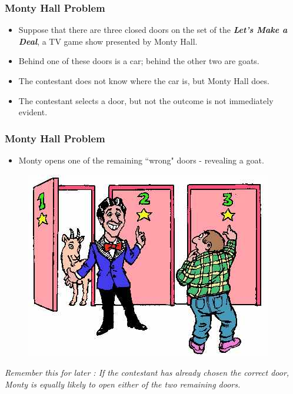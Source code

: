 \documentclass{beamer}
\begin{document}
\begin{frame}
	
	\frametitle{Monty Hall Problem}\LARGE
	\begin{itemize}
	\item Suppose that there are three closed doors on the set of the  \textbf{\emph{Let's Make a Deal}}, a TV game show presented by Monty Hall. 
	\item Behind one of these doors is a car; behind the other two are goats. 
	\item The contestant does not know where the car is, but Monty Hall does.
	
	\item 
	The contestant selects a door, but not the outcome is not immediately evident. 
	\end{itemize}
	
\end{frame}
\begin{frame}
	
	\frametitle{Monty Hall Problem}\LARGE
	\begin{itemize}
	\item Monty opens one of the remaining ``wrong" doors - revealing a goat.
\end{itemize}

\begin{figure}
\centering
\includegraphics[width=0.7\linewidth]{MontyHall/goat}
\caption{}
\label{fig:goat}
\end{figure}

	{ \Large \textit{Remember this for later : If the contestant has already chosen the correct door, Monty is equally likely to open either of the two remaining doors.}
}
\end{frame}
\end{document}
